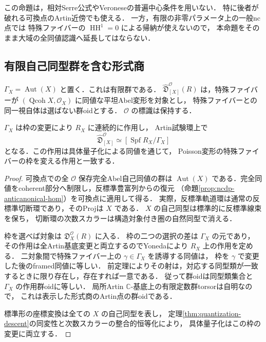 この命題は，相対Serre公式やVeroneseの普遍中心条件を用いない．
特に後者が破れる可換点のArtin近傍でも使える．
一方，有限の非零パラメータ上の一般nc点では
特殊ファイバーの $\operatorname{HH}^1=0$ による帰納が使えないので，
本命題をそのまま大域の全同値認識へ延長してはならない．

\subsection{有限自己同型群を含む形式商}
$\Gamma_X=\operatorname{Aut}(X)$ と置く．これは有限群である．
$\widehat{\mathfrak D}^{\mathcal O}_{[X]}(R)$ は，特殊ファイバーが
$(\operatorname{Qcoh}X,\mathcal O_X)$ に同値な平坦Abel変形を対象とし，
特殊ファイバーとの同一視自体は選ばない群oidとする．
$\mathcal O$ の標識は保持する．

\begin{theorem}[自己同型を含む形式局所商]
\label{thm:unframed-formal-quotient}
$\Gamma_X$ は枠の変更により $R_X$ に連続的に作用し，
Artin試験環上で
\[
 \widehat{\mathfrak D}^{\mathcal O}_{[X]}
 \simeq[\operatorname{Spf}R_X/\Gamma_X]
\]
となる．この作用は具体量子化による同値を通じて，
Poisson変形の特殊ファイバーの枠を変える作用と一致する．
\end{theorem}
\begin{proof}
可換点での全 $\mathcal O$ 保存完全Abel自己同値の群は
$\operatorname{Aut}(X)$ である．完全同値をcoherent部分へ制限し，反標準豊富列からの復元
（命題\ref{prop:ncdp-anticanonical-hom}）を可換点に適用して得る．
実際，反標準軌道環は通常の反標準切断環であり，そのProjは $X$ である．
$X$ の自己同型は標準的に反標準線束を保ち，
切断環の次数スカラーは構造対象付き圏の自然同型で消える．

枠を選べば対象は $\mathfrak D_X^{\mathcal O}(R)$ に入る．
枠の二つの選択の差は $\Gamma_X$ の元であり，
その作用は全Artin基底変更と両立するのでYonedaにより $R_X$ 上の作用を定める．
二対象間で特殊ファイバー上の $\gamma\in\Gamma_X$ を誘導する同値は，
枠を $\gamma$ で変更した後のframed同値に等しい．
前定理によりその射は，対応する同型類が一致するときに限り存在し，存在すれば一意である．
従って群oidは同型類集合と $\Gamma_X$ の作用群oidに等しい．
局所Artin $\mathbb C$-基底上の有限定数群torsorは自明なので，
これは表示した形式商のArtin点の群oidである．

標準形の座標変換は全ての $X$ の自己同型を表し，
定理\ref{thm:quantization-descent}の同変性と次数スカラーの整合的恒等化により，
具体量子化はこの枠の変更に両立する．
\end{proof}

